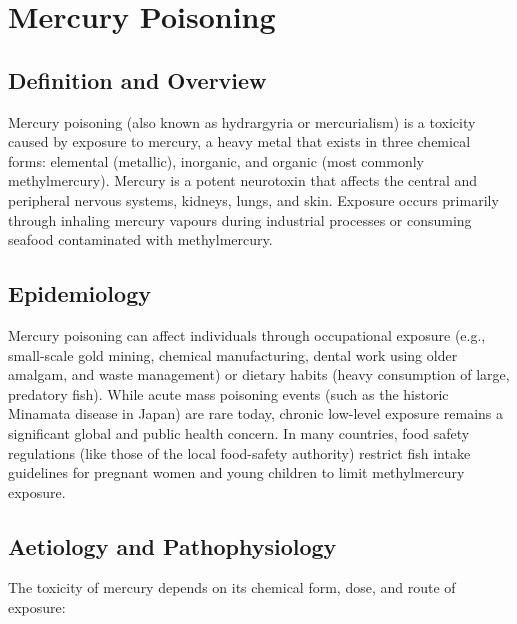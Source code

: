 \chapter{Mercury Poisoning}

\section*{Definition and Overview}
Mercury poisoning (also known as hydrargyria or mercurialism) is a toxicity caused by exposure to mercury, a heavy metal that exists in three chemical forms: elemental (metallic), inorganic, and organic (most commonly methylmercury). Mercury is a potent neurotoxin that affects the central and peripheral nervous systems, kidneys, lungs, and skin. Exposure occurs primarily through inhaling mercury vapours during industrial processes or consuming seafood contaminated with methylmercury.

\section*{Epidemiology}
Mercury poisoning can affect individuals through occupational exposure (e.g., small-scale gold mining, chemical manufacturing, dental work using older amalgam, and waste management) or dietary habits (heavy consumption of large, predatory fish). While acute mass poisoning events (such as the historic Minamata disease in Japan) are rare today, chronic low-level exposure remains a significant global and public health concern. In many countries, food safety regulations (like those of the local food-safety authority) restrict fish intake guidelines for pregnant women and young children to limit methylmercury exposure.

\section*{Aetiology and Pathophysiology}
The toxicity of mercury depends on its chemical form, dose, and route of exposure:

